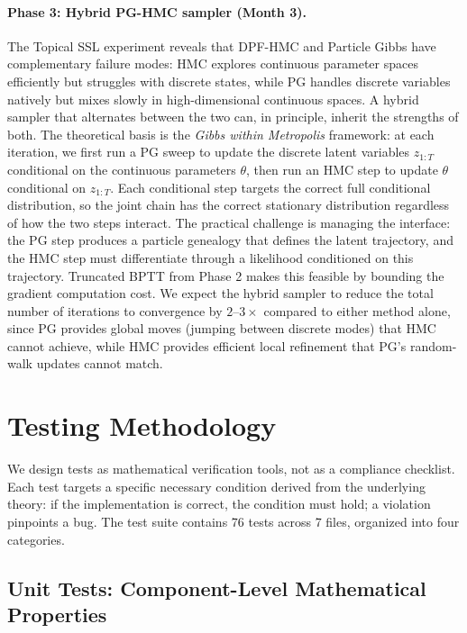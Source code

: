 \documentclass[12pt,a4paper]{article}
\theoremstyle{definition}
\theoremstyle{remark}
\begin{document}
\paragraph{Phase 3: Hybrid PG-HMC sampler (Month 3).}
The Topical SSL experiment reveals that DPF-HMC and Particle Gibbs have complementary failure modes: HMC explores continuous parameter spaces efficiently but struggles with discrete states, while PG handles discrete variables natively but mixes slowly in high-dimensional continuous spaces. A hybrid sampler that alternates between the two can, in principle, inherit the strengths of both. The theoretical basis is the \emph{Gibbs within Metropolis} framework: at each iteration, we first run a PG sweep to update the discrete latent variables $z_{1:T}$ conditional on the continuous parameters $\theta$, then run an HMC step to update $\theta$ conditional on $z_{1:T}$. Each conditional step targets the correct full conditional distribution, so the joint chain has the correct stationary distribution regardless of how the two steps interact. The practical challenge is managing the interface: the PG step produces a particle genealogy that defines the latent trajectory, and the HMC step must differentiate through a likelihood conditioned on this trajectory. Truncated BPTT from Phase 2 makes this feasible by bounding the gradient computation cost. We expect the hybrid sampler to reduce the total number of iterations to convergence by $2\text{--}3\times$ compared to either method alone, since PG provides global moves (jumping between discrete modes) that HMC cannot achieve, while HMC provides efficient local refinement that PG's random-walk updates cannot match.


\section{Testing Methodology}
\label{sec:testing}

We design tests as mathematical verification tools, not as a compliance checklist. Each test targets a specific necessary condition derived from the underlying theory: if the implementation is correct, the condition must hold; a violation pinpoints a bug. The test suite contains 76 tests across 7 files, organized into four categories.

\subsection{Unit Tests: Component-Level Mathematical Properties}
\end{document}
